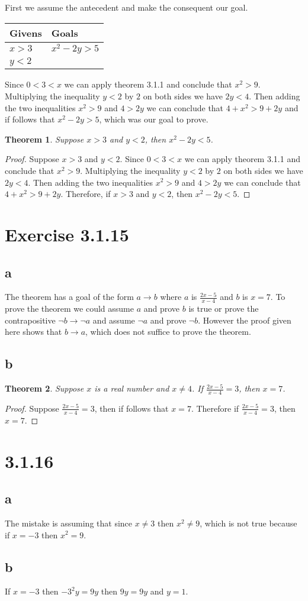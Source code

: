 \documentclass{article}
\newcommand{\n}{ \noindent }
\newtheorem*{theorem}{Theorem}  %
\begin{document}
\n First we assume the antecedent and make the consequent our goal. \\

\begin{table}[h]
\begin{tabular}{ll}
\hline
Givens & Goals   \\ \hline
$x > 3$ & $x^2 - 2y > 5$ \\
$y < 2$ &\\ \hline
\end{tabular}
\end{table}


\n Since $0<3<x$ we can apply theorem 3.1.1 and conclude that $x^2 > 9$. Multiplying the inequality $y <2$ by $2$ on both sides we have $2y<4$. Then adding the two inequalities $x^2 > 9$ and $4 > 2y$ we can conclude that $4 + x^2 > 9 + 2y$ and if follows that $x^2 - 2y > 5$, which was our goal to prove.

\begin{theorem} Suppose $x>3$ and $y<2$, then $x^2 - 2y < 5$.
\end{theorem}
\begin{proof}
Suppose $x>3$ and $y<2$. Since $0<3<x$ we can apply theorem 3.1.1 and conclude that $x^2 > 9$. Multiplying the inequality $y <2$ by $2$ on both sides we have $2y<4$. Then adding the two inequalities $x^2 > 9$ and $4 > 2y$ we can conclude that $4 + x^2 > 9 + 2y$. Therefore, if $x>3$ and $y<2$, then $x^2 - 2y < 5$.
\end{proof}

\section*{Exercise 3.1.15}
\subsection*{a}
The theorem has a goal of the form $a \rightarrow b$ where $a$ is $\tfrac{2x-5}{x-4}$ and $b$ is $x = 7$. To prove the theorem we could assume $a$ and prove $b$ is true or prove the contrapositive $\lnot b \rightarrow \lnot a$ and assume $\lnot a$ and prove $\lnot b$. However the proof given here shows that $b \rightarrow a$, which does not suffice to prove the theorem.

\subsection*{b}
\begin{theorem} Suppose $x$ is a real number and $x \neq 4$. If $\tfrac{2x-5}{x-4} = 3$, then $x=7$.
\end{theorem}
\begin{proof}
Suppose $\tfrac{2x-5}{x-4} = 3$, then if follows that $x=7$. Therefore if $\tfrac{2x-5}{x-4} = 3$, then $x = 7$.
\end{proof}

\section*{3.1.16}
\subsection*{a}
The mistake is assuming that since $x \neq 3$ then $x^2 \neq 9$, which is not true because if $x = -3$ then $x^2 = 9$.
\subsection*{b}
If $x = -3$ then $-3^2y=9y$ then $9y=9y$ and $y = 1$.
\end{document}
